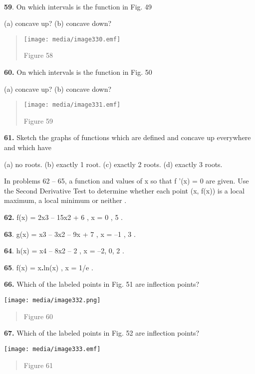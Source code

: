 \textbf{\\
}

\textbf{59}. On which intervals is the function in Fig. 49

(a) concave up? (b) concave down?

\begin{quote}
\texttt{[image: media/image330.emf]}

Figure 58
\end{quote}

\textbf{60.} On which intervals is the function in Fig. 50

(a) concave up? (b) concave down?

\begin{quote}
\texttt{[image: media/image331.emf]}

Figure 59
\end{quote}

\textbf{61.} Sketch the graphs of functions which are defined and
concave up everywhere and which have

(a) no roots. (b) exactly 1 root. (c) exactly 2 roots. (d) exactly 3
roots.

In problems 62 -- 65, a function and values of x so that f '(x) = 0 are
given. Use the Second Derivative Test to determine whether each point
(x, f(x)) is a local maximum, a local minimum or neither .

\textbf{62.} f(x) = 2x3 -- 15x2 + 6 , x = 0 , 5 .

\textbf{63}. g(x) = x3 -- 3x2 -- 9x + 7 , x = --1 , 3 .

\textbf{64}. h(x) = x4 -- 8x2 -- 2 , x = --2, 0, 2 .

\textbf{65}. f(x) = x\textbf{.}ln(x) , x = 1/e .

\textbf{66.} Which of the labeled points in Fig. 51 are inflection
points?

\texttt{[image: media/image332.png]}

\begin{quote}
Figure 60
\end{quote}

\textbf{67.} Which of the labeled points in Fig. 52 are inflection
points?

\texttt{[image: media/image333.emf]}

\begin{quote}
Figure 61
\end{quote}

